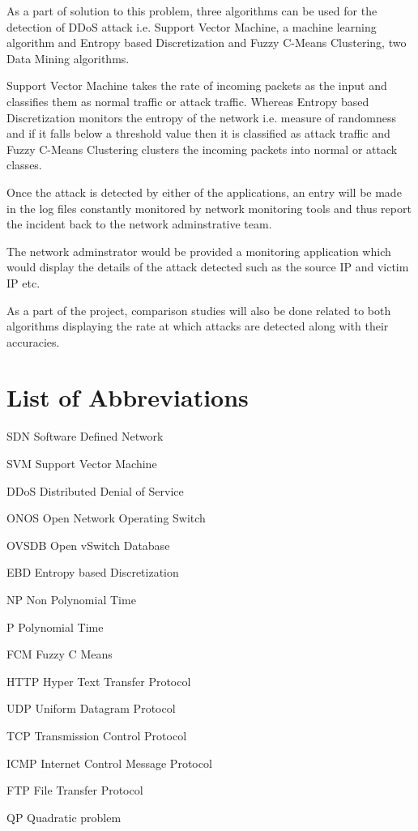 \documentclass[12pt,a4paper,final]{report}
\newcommand{\abbrlabel}[1]{\makebox[6cm][l]{\textbf{#1}\ \dotfill}}
\newenvironment{abbreviations}{\begin{list}{}{\renewcommand{\makelabel}{\abbrlabel}}}{\end{list}}
\begin{document}
As a part of solution to this problem, three algorithms can be used for the detection of DDoS attack i.e. Support Vector Machine, a machine learning algorithm and Entropy based Discretization and Fuzzy C-Means Clustering, two Data Mining algorithms.

Support Vector Machine takes the rate of incoming packets as the input and classifies them as normal traffic or attack traffic. Whereas Entropy based Discretization monitors the entropy of the network i.e. measure of randomness and if it falls below a threshold value then it is classified as attack traffic and Fuzzy C-Means Clustering clusters the incoming packets into normal or attack classes.

Once the attack is detected by either of the applications, an entry will be made in the log files constantly monitored by network monitoring tools and thus report the incident back to the network adminstrative team.

The network adminstrator would be provided a monitoring application which would display the details of the attack detected such as the source IP and victim IP etc.

As a part of the project, comparison studies will also be done related to both algorithms displaying the rate at which attacks are detected along with their accuracies.
\newpage

\listoffigures
{}
\newpage
\listoftables
{}
\newpage

\chapter*{\centering List of Abbreviations}
\begin{abbreviations}
\item[SDN] Software Defined Network
\item[SVM] Support Vector Machine
\item[DDoS] Distributed Denial of Service
\item[ONOS] Open Network Operating Switch
\item[OVSDB] Open vSwitch Database
\item[EBD] Entropy based Discretization
\item[NP] Non Polynomial Time
\item[P] Polynomial Time
\item[FCM] Fuzzy C Means 
\item[HTTP] Hyper Text Transfer Protocol
\item[UDP] Uniform Datagram Protocol
\item[TCP] Transmission Control Protocol
\item[ICMP] Internet Control Message Protocol
\item[FTP] File Transfer Protocol
\item[QP] Quadratic problem
\end{abbreviations}
\end{document}
